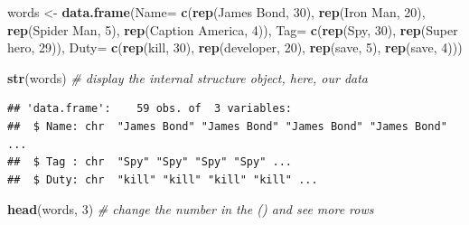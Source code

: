 \documentclass[
]{book}
\newenvironment{Shaded}{\begin{snugshade}}{\end{snugshade}}
\newcommand{\AttributeTok}[1]{\textcolor[rgb]{0.13,0.29,0.53}{#1}}
\newcommand{\CommentTok}[1]{\textcolor[rgb]{0.56,0.35,0.01}{\textit{#1}}}
\newcommand{\DecValTok}[1]{\textcolor[rgb]{0.00,0.00,0.81}{#1}}
\newcommand{\FunctionTok}[1]{\textcolor[rgb]{0.13,0.29,0.53}{\textbf{#1}}}
\newcommand{\NormalTok}[1]{#1}
\newcommand{\OtherTok}[1]{\textcolor[rgb]{0.56,0.35,0.01}{#1}}
\newcommand{\StringTok}[1]{\textcolor[rgb]{0.31,0.60,0.02}{#1}}
\begin{document}
\begin{Shaded}
\begin{Highlighting}[]
\NormalTok{words }\OtherTok{\textless{}{-}} \FunctionTok{data.frame}\NormalTok{(}\AttributeTok{Name=} \FunctionTok{c}\NormalTok{(}\FunctionTok{rep}\NormalTok{(}\StringTok{\textquotesingle{}James Bond\textquotesingle{}}\NormalTok{, }\DecValTok{30}\NormalTok{),}
                    \FunctionTok{rep}\NormalTok{(}\StringTok{\textquotesingle{}Iron Man\textquotesingle{}}\NormalTok{, }\DecValTok{20}\NormalTok{),}
                    \FunctionTok{rep}\NormalTok{(}\StringTok{\textquotesingle{}Spider Man\textquotesingle{}}\NormalTok{, }\DecValTok{5}\NormalTok{),}
                    \FunctionTok{rep}\NormalTok{(}\StringTok{\textquotesingle{}Caption America\textquotesingle{}}\NormalTok{, }\DecValTok{4}\NormalTok{)),}
                    \AttributeTok{Tag=} \FunctionTok{c}\NormalTok{(}\FunctionTok{rep}\NormalTok{(}\StringTok{\textquotesingle{}Spy\textquotesingle{}}\NormalTok{, }\DecValTok{30}\NormalTok{),}
                               \FunctionTok{rep}\NormalTok{(}\StringTok{\textquotesingle{}Super hero\textquotesingle{}}\NormalTok{, }\DecValTok{29}\NormalTok{)),}
                    \AttributeTok{Duty=} \FunctionTok{c}\NormalTok{(}\FunctionTok{rep}\NormalTok{(}\StringTok{\textquotesingle{}kill\textquotesingle{}}\NormalTok{, }\DecValTok{30}\NormalTok{),}
                            \FunctionTok{rep}\NormalTok{(}\StringTok{\textquotesingle{}developer\textquotesingle{}}\NormalTok{, }\DecValTok{20}\NormalTok{),}
                            \FunctionTok{rep}\NormalTok{(}\StringTok{\textquotesingle{}save\textquotesingle{}}\NormalTok{, }\DecValTok{5}\NormalTok{),}
                            \FunctionTok{rep}\NormalTok{(}\StringTok{\textquotesingle{}save\textquotesingle{}}\NormalTok{, }\DecValTok{4}\NormalTok{)))}

\FunctionTok{str}\NormalTok{(words) }\CommentTok{\# display the internal structure \textasciigrave{}object\textasciigrave{}, here, our \textasciigrave{}data\textasciigrave{}}
\end{Highlighting}
\end{Shaded}

\begin{verbatim}
## 'data.frame':    59 obs. of  3 variables:
##  $ Name: chr  "James Bond" "James Bond" "James Bond" "James Bond" ...
##  $ Tag : chr  "Spy" "Spy" "Spy" "Spy" ...
##  $ Duty: chr  "kill" "kill" "kill" "kill" ...
\end{verbatim}

\begin{Shaded}
\begin{Highlighting}[]
\FunctionTok{head}\NormalTok{(words, }\DecValTok{3}\NormalTok{) }\CommentTok{\# change the number in the () and see more rows}
\end{Highlighting}
\end{Shaded}
\end{document}
